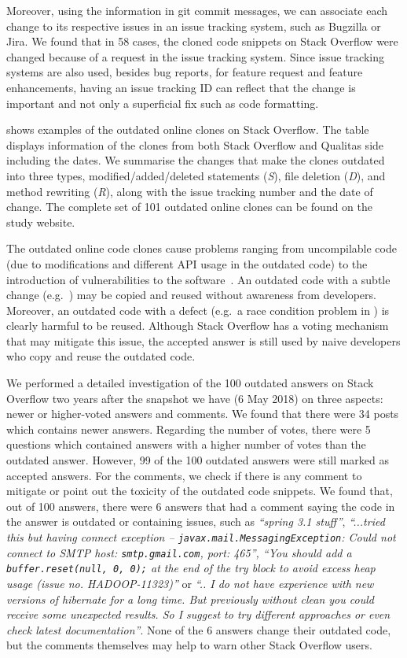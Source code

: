 \documentclass[10pt,journal,compsoc]{IEEEtran}
\begin{document}
Moreover, using the information in git commit messages, we can associate each
change to its respective issues in an issue tracking system, such as Bugzilla or
Jira. We found that in 58 cases, the cloned code snippets on Stack Overflow were
changed because of a request in the issue tracking system. Since issue tracking
systems are also used, besides bug reports, for feature request and feature
enhancements, having an issue tracking ID can reflect that the change is important
and not only a superficial fix such as code formatting.

 shows examples of the outdated online clones on
Stack Overflow. The table displays information of the clones from both Stack
Overflow and Qualitas side including the dates. We summarise the changes that
make the clones outdated into three types, modified/added/deleted statements
(\textit{S}), file deletion (\textit{D}), and method rewriting (\textit{R}),
along with the issue tracking number and the date of change. The complete set of
101 outdated online clones can be found on the study website.

The outdated online code clones cause problems ranging from uncompilable code
(due to modifications and different API usage in the outdated code) to
the introduction of vulnerabilities to the software~\cite{Xia2014}. An outdated code with a
subtle change (e.g.\ ) may be copied and reused without
awareness from developers. Moreover, an outdated code with a defect (e.g.\ a race
condition problem in ) is clearly harmful to be reused.
Although Stack Overflow has a voting mechanism that may mitigate this issue, the
accepted answer is still used by naive developers who copy and reuse the
outdated code.

We performed a detailed investigation of the 100 outdated answers on Stack
Overflow two years after the snapshot we have (6 May 2018) 
on three aspects: newer or higher-voted answers and comments. We found
that there were 34 posts which contains newer answers. Regarding the number of
votes, there were 5 questions which contained answers with a higher number of
votes than the outdated answer. However, 99 of the 100 outdated answers were still
marked as accepted answers. For the comments, we check if there is any comment
to mitigate or point out the toxicity of the outdated code snippets. We found
that, out of 100 answers, there were 6 answers that had a comment saying the
code in the answer is outdated or containing issues, such as \textit{``spring
	3.1 stuff''}, \textit{``...tried this but having connect exception --
	\texttt{javax.mail.MessagingException}:\textit{ Could not connect to SMTP host:
	\texttt{smtp.gmail.com}, port: 465''}, ``You should add a \texttt{buffer.reset(null, 0, 0);} at the end of the try block to avoid excess heap usage (issue no. HADOOP-11323)''} or \textit{``.. I do not have experience
	with new versions of hibernate for a long time. But previously without clean you
	could receive some unexpected results. So I suggest to try different approaches
	or even check latest documentation''}. None of the 6 answers change their
outdated code, but the comments themselves may help to warn other Stack Overflow
users.
\end{document}
